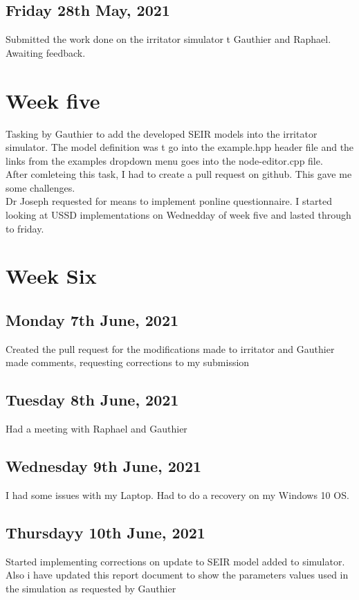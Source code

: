 \documentclass[a4paper, 12pt, notitlepage]{report}
\begin{document}
\subsection{Friday 28th May, 2021}
 Submitted the work done on the irritator simulator t Gauthier and Raphael. Awaiting feedback. 
 
 \section{Week five}
 Tasking by Gauthier to add the developed SEIR models into the irritator simulator. The model definition was t go into the example.hpp header file and the links from the examples dropdown menu goes into the node-editor.cpp file.\\
 
 After comleteing this task, I had to create a pull request on github. This gave me some challenges.\\
 
 Dr Joseph requested for means to implement ponline questionnaire. I started looking at USSD implementations on Wednedday of week five and lasted through to friday.\\
 
  \section{Week Six}
  \subsection{Monday 7th June, 2021}
  Created the pull request for the modifications made to irritator and Gauthier made comments, requesting corrections to my submission\\
    \subsection{Tuesday 8th June, 2021}
  Had a meeting with Raphael and Gauthier\\
  
  \subsection{Wednesday 9th June, 2021}
  I had some issues with my Laptop. Had to do a recovery on my Windows 10 OS.
  
    \subsection{Thursdayy 10th June, 2021}
    Started implementing corrections on update to SEIR model added to simulator. Also i have updated this report document to show the parameters values used in the simulation as requested by Gauthier
 
\end{document}
